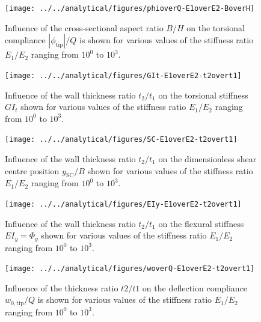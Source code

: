   \begin{figure}[!htpb] %
    \centering
    \texttt{[image: ../../analytical/figures/phioverQ-E1overE2-BoverH]}
    \caption[Influence of the cross-sectional aspect ratio $B/H$ on the torsional compliance]{Influence of the cross-sectional aspect ratio $B/H$ on the torsional compliance $|\phi_{\mathrm{tip}}| / Q$ is shown for various values of the stiffness ratio $E_1/E_2$ ranging from $10^0$ to $10^3$. }\label{fig:phioverQ-E1overE2-BoverH}
  \end{figure}

  \begin{figure}[!htpb] %
    \centering
    \texttt{[image: ../../analytical/figures/GIt-E1overE2-t2overt1]}
    \caption[Influence of the wall thickness ratio $t_2/t_1$ on the torsional stiffness $GI_t$]{Influence of the wall thickness ratio $t_2/t_1$ on the torsional stiffness $GI_t$ shown for various values of the stiffness ratio $E_1/E_2$ ranging from $10^0$ to $10^3$. }\label{fig:GIt-E1overE2-t2overt1}
  \end{figure}

  \begin{figure}[!htpb] %
    \centering
    \texttt{[image: ../../analytical/figures/SC-E1overE2-t2overt1]}
    \caption[Influence of the wall thickness ratio $t_2/t_1$ on the dimensionless shear centre position $y_{\mathrm{SC}}/B$]{Influence of the wall thickness ratio $t_2/t_1$ on the dimensionless shear centre position $y_{\mathrm{SC}}/B$ shown for various values of the stiffness ratio $E_1/E_2$ ranging from $10^0$ to $10^3$. }\label{fig:SC-E1overE2-t2overt1}
  \end{figure}

  \begin{figure}[!htpb] %
    \centering
    \texttt{[image: ../../analytical/figures/EIy-E1overE2-t2overt1]}
    \caption[Influence of the wall thickness ratio $t_2/t_1$ on the flexural stiffness $EI_y$]{Influence of the wall thickness ratio $t_2/t_1$ on the flexural stiffness $EI_y = \Phi_y$ shown for various values of the stiffness ratio $E_1/E_2$ ranging from $10^0$ to $10^3$. }\label{fig:EIy-E1overE2-t2overt1}
  \end{figure}

  \begin{figure}[!htpb] %
    \centering
    \texttt{[image: ../../analytical/figures/woverQ-E1overE2-t2overt1]}
    \caption[Influence of the thickness ratio $t2/t1$ on the deflection compliance]{Influence of the thickness ratio $t2/t1$ on the deflection compliance $w_{\mathrm{0,tip}} / Q$ is shown for various values of the stiffness ratio $E_1/E_2$ ranging from $10^0$ to $10^3$. }\label{fig:woverQ-E1overE2-t2overt1}
  \end{figure}

